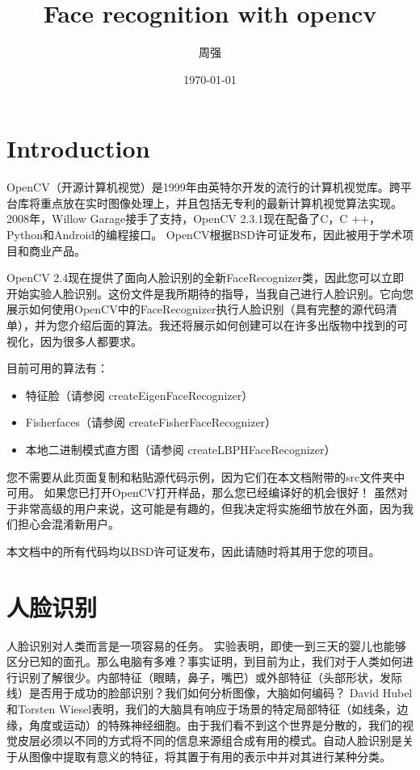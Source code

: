 \documentclass[UTF8]{ctexart}
\title{Face recognition with opencv}
\author{周强}
\date{\today}
\begin{document}
\maketitle %
\tableofcontents %
\newpage %

\section{Introduction}
OpenCV（开源计算机视觉）是1999年由英特尔开发的流行的计算机视觉库。跨平台库将重点放在实时图像处理上，并且包括无专利的最新计算机视觉算法实现。 2008年，Willow Garage接手了支持，OpenCV 2.3.1现在配备了C，C ++，Python和Android的编程接口。 OpenCV根据BSD许可证发布，因此被用于学术项目和商业产品。

OpenCV 2.4现在提供了面向人脸识别的全新FaceRecognizer类，因此您可以立即开始实验人脸识别。这份文件是我所期待的指导，当我自己进行人脸识别。它向您展示如何使用OpenCV中的FaceRecognizer执行人脸识别（具有完整的源代码清单），并为您介绍后面的算法。我还将展示如何创建可以在许多出版物中找到的可视化，因为很多人都要求。

目前可用的算法有：
\begin{itemize}
     \item 特征脸（请参阅 createEigenFaceRecognizer）
     \item Fisherfaces（请参阅 createFisherFaceRecognizer）
     \item 本地二进制模式直方图（请参阅 createLBPHFaceRecognizer）
\end{itemize}

您不需要从此页面复制和粘贴源代码示例，因为它们在本文档附带的src文件夹中可用。 如果您已打开OpenCV打开样品，那么您已经编译好的机会很好！ 虽然对于非常高级的用户来说，这可能是有趣的，但我决定将实施细节放在外面，因为我们担心会混淆新用户。

本文档中的所有代码均以BSD许可证发布，因此请随时将其用于您的项目。

\section{人脸识别}
人脸识别对人类而言是一项容易的任务。 实验表明，即使一到三天的婴儿也能够区分已知的面孔。那么电脑有多难？事实证明，到目前为止，我们对于人类如何进行识别了解很少。内部特征（眼睛，鼻子，嘴巴）或外部特征（头部形状，发际线）是否用于成功的脸部识别？我们如何分析图像，大脑如何编码？ David Hubel和Torsten Wiesel表明，我们的大脑具有响应于场景的特定局部特征（如线条，边缘，角度或运动）的特殊神经细胞。由于我们看不到这个世界是分散的，我们的视觉皮层必须以不同的方式将不同的信息来源组合成有用的模式。自动人脸识别是关于从图像中提取有意义的特征，将其置于有用的表示中并对其进行某种分类。
\end{document}
